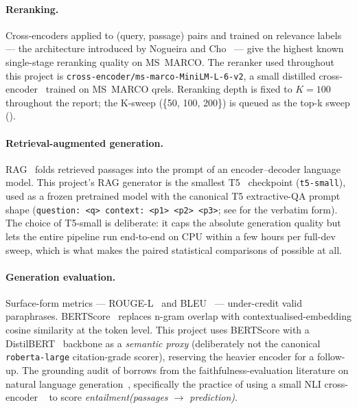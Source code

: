 \documentclass[11pt,a4paper]{article}
\newcommand{\msmarco}{MS~MARCO}
\newcommand{\rougel}{ROUGE-L}
\newcommand{\bertscore}{BERTScore}
\newcommand{\code}[1]{\texttt{#1}}
\begin{document}
\paragraph{Reranking.}  Cross-encoders applied to (query, passage)
pairs and trained on relevance labels --- the architecture introduced
by Nogueira and Cho~\cite{nogueira2019passage} --- give the highest
known single-stage reranking quality on \msmarco{}.  The reranker used
throughout this project is \texttt{cross-encoder/ms-marco-MiniLM-L-6-v2},
a small distilled cross-encoder~\cite{wang2020minilm} trained on
\msmarco{} qrels.  Reranking depth is fixed to $K\!=\!100$ throughout
the report; the K-sweep (\{50, 100, 200\}) is queued as the top-k sweep
().

\paragraph{Retrieval-augmented generation.}  RAG~\cite{lewis2020rag}
folds retrieved passages into the prompt of an encoder--decoder
language model.  This project's RAG generator is the smallest
T5~\cite{raffel2020t5} checkpoint (\texttt{t5-small}), used as a
frozen pretrained model with the canonical T5 extractive-QA prompt
shape (\code{question:~<q>~context:~<p1>~<p2>~<p3>}; see
 for the verbatim form).
The choice of T5-small is deliberate: it caps the absolute generation
quality but lets the entire pipeline run end-to-end on CPU within a
few hours per full-dev sweep, which is what makes the paired
statistical comparisons of  possible at all.

\paragraph{Generation evaluation.}  Surface-form metrics ---
\rougel{}~\cite{lin2004rouge} and
BLEU~\cite{papineni2002bleu} --- under-credit valid paraphrases.
\bertscore{}~\cite{zhang2020bertscore} replaces n-gram overlap with
contextualised-embedding cosine similarity at the token level.  This
project uses BERTScore with a DistilBERT~\cite{sanh2019distilbert}
backbone as a \emph{semantic proxy} (deliberately not the canonical
\texttt{roberta-large} citation-grade scorer), reserving the heavier
encoder for a follow-up.  The grounding audit of 
borrows from the faithfulness-evaluation literature on natural
language generation~\cite{ji2023hallucination,honovich2022true},
specifically the practice of using a small NLI cross-encoder
~\cite{he2023debertav3,williams2018mnli} to score
\emph{entailment(passages $\to$ prediction)}.
\end{document}
